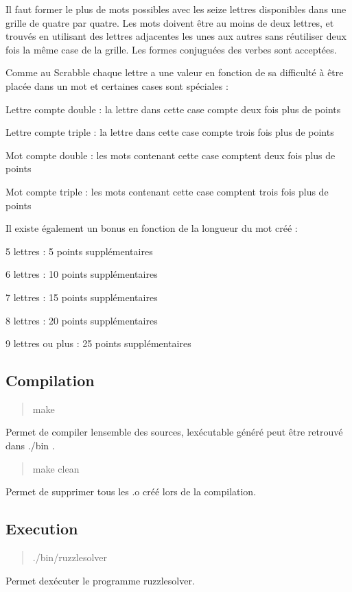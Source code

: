 Il faut former le plus de mots possibles avec les seize lettres disponibles dans une grille de quatre par quatre. Les mots doivent être au moins de deux lettres, et trouvés en utilisant des lettres adjacentes les unes aux autres sans réutiliser deux fois la même case de la grille. Les formes conjuguées des verbes sont acceptées.

Comme au Scrabble chaque lettre a une valeur en fonction de sa difficulté à être placée dans un mot et certaines cases sont spéciales \+:


\begin{DoxyItemize}
\item Lettre compte double \+: la lettre dans cette case compte deux fois plus de points
\item Lettre compte triple \+: la lettre dans cette case compte trois fois plus de points
\item Mot compte double \+: les mots contenant cette case comptent deux fois plus de points
\item Mot compte triple \+: les mots contenant cette case comptent trois fois plus de points
\end{DoxyItemize}

Il existe également un bonus en fonction de la longueur du mot créé \+:


\begin{DoxyItemize}
\item 5 lettres \+: 5 points supplémentaires
\item 6 lettres \+: 10 points supplémentaires
\item 7 lettres \+: 15 points supplémentaires
\item 8 lettres \+: 20 points supplémentaires
\item 9 lettres ou plus \+: 25 points supplémentaires
\end{DoxyItemize}

\subsection*{Compilation}

\begin{quote}
make \end{quote}


Permet de compiler l\textquotesingle{}ensemble des sources, l\textquotesingle{}exécutable généré peut être retrouvé dans ./bin .

\begin{quote}
make clean \end{quote}


Permet de supprimer tous les .o créé lors de la compilation.

\subsection*{Execution}

\begin{quote}
./bin/ruzzlesolver \end{quote}


Permet d\textquotesingle{}exécuter le programme ruzzlesolver. 